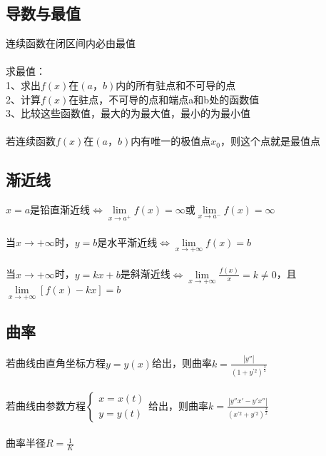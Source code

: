 \documentclass{article}
\begin{document}
\begin{flushleft}
	\subsection{导数与最值}
	
	连续函数在闭区间内必由最值\\
	~\\
	求最值：\\
	1、求出$f(x)$在$(a，b)$内的所有驻点和不可导的点\\
	2、计算$f(x)$在驻点，不可导的点和端点a和b处的函数值\\
	3、比较这些函数值，最大的为最大值，最小的为最小值\\
	~\\
	若连续函数$f(x)$在$(a，b)$内有唯一的极值点$x_0$，则这个点就是最值点\\
	
	\subsection{渐近线}
	
	$x=a$是铅直渐近线$\Leftrightarrow \lim\limits_{x\to a^+}f(x)=\infty$或$\lim\limits_{x\to a^-}f(x)=\infty$\\
	~\\
	当$x\to +\infty$时，$y=b$是水平渐近线$\Leftrightarrow \lim\limits_{x\to +\infty}f(x)=b$\\
	~\\
	当$x\to +\infty$时，$y=kx+b$是斜渐近线$\Leftrightarrow \lim\limits_{x\to +\infty}\frac{f(x)}{x}=k\neq 0$，且$\lim\limits_{x\to +\infty}[f(x)-kx]=b$\\
	
	\subsection{曲率}
	
	若曲线由直角坐标方程$y=y(x)$给出，则曲率$k=\frac{|y''|}{(1+y^{'2})^{\frac{3}{2}}}$\\
	~\\
	若曲线由参数方程$\left\{
	\begin{array}{rcl}
	x=x(t)\\
	y=y(t)
	\end{array} \right.$给出，则曲率$k=\frac{|y''x'-y'x''|}{(x^{'2}+y^{'2})^{\frac{3}{2}}}$\\
	~\\
	曲率半径$R=\frac{1}{K}$\\
	
\end{flushleft}
\end{document}
